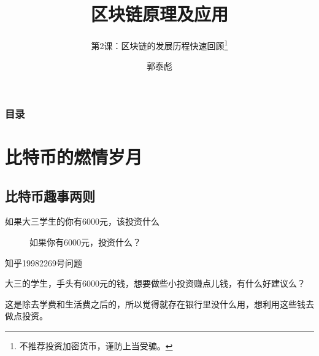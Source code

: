 \documentclass[11pt]{beamer}
\begin{document}
\author{郭泰彪}
\title{区块链原理及应用}
\subtitle{第2课：区块链的发展历程快速回顾\footnote{不推荐投资加密货币，谨防上当受骗。}}

\begin{frame}[plain]
	\maketitle
\end{frame}

\begin{frame}[shrink]
	\frametitle{目录}
	\tableofcontents[sectionstyle=show,subsectionstyle=show/shaded]
\end{frame}

\section{比特币的燃情岁月}

\subsection{比特币趣事两则}
\begin{frame}{如果大三学生的你有6000元，该投资什么}
	\begin{figure}
		\centering
		{\Huge 如果你有6000元，投资什么？}
	\end{figure}
\end{frame}

\begin{frame}{知乎19982269号问题}

	大三的学生，手头有6000元的钱，想要做些小投资赚点儿钱，有什么好建议么？

	\footnotesize{这是除去学费和生活费之后的，所以觉得就存在银行里没什么用，想利用这些钱去做点投资。}
\end{frame}
\end{document}

